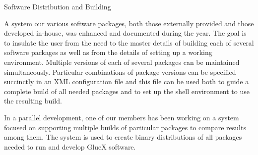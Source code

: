 Software Distribution and Building

A system our various software packages, both those externally provided
and those developed in-house, was enhanced and documented during the
year. The goal is to insulate the user from the need to the master
details of building each of several software packages as well as from
the details of setting up a working environment. Multiple versions of
each of several packages can be maintained simultaneously. Particular
combinations of package versions can be specified succinctly in an XML
configuration file and this file can be used both to guide a complete
build of all needed packages and to set up the shell environment to
use the resulting build.

In a parallel development, one of our members has been working on a
system focused on supporting multiple builds of particular packages to
compare results among them. The system is used to create binary
distributions of all packages needed to run and develop GlueX
software.

